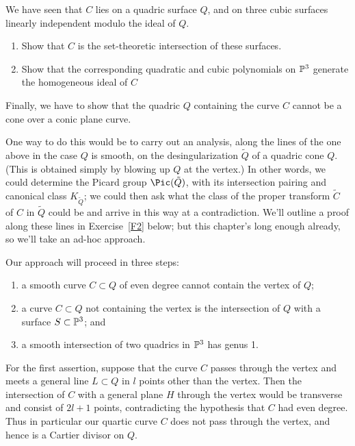 \begin{exercise}
We have seen that $C$ lies on a quadric surface $Q$, and on three cubic surfaces linearly independent modulo the ideal of $Q$.
\begin{enumerate}
\item Show that $C$ is the set-theoretic intersection of these surfaces.
\item Show that the corresponding quadratic and cubic polynomials on $\PP^3$ generate the homogeneous ideal of $C$
\end{enumerate}
\end{exercise}

Finally, we have to show that the quadric $Q$ containing the curve $C$ cannot be a cone over a conic plane curve. 

One way to do this would be to carry out an analysis, along the lines of the one above in the case $Q$ is smooth, on the desingularization $\tilde Q$ of a quadric cone $Q$. (This is obtained simply by  blowing up $Q$ at the vertex.) In other words, we could determine the Picard group $\Pic(\tilde Q)$, with its intersection pairing and canonical class $K_{\tilde Q}$; we could then ask what the class of the proper transform $\tilde C$ of $C$ in $\tilde Q$ could be and arrive in this way at a contradiction. We'll outline a proof along these lines in Exercise~\ref{F2} below; but this chapter's long enough already, so we'll take an ad-hoc approach.

Our approach will proceed in three steps:

\begin{enumerate}
\item a smooth curve $C \subset Q$ of even degree cannot contain the vertex of $Q$;
\item a curve $C \subset Q$ not containing the vertex is the intersection of $Q$ with a surface $S \subset \PP^3$; and
\item a smooth  intersection of two quadrics in $\PP^3$ has genus 1.
\end{enumerate}

For the first assertion, suppose that the curve $C$ passes through the vertex and meets a general line $L \subset Q$ in $l$ points other than the vertex. Then the intersection of $C$ with a general plane $H$ through the vertex would be transverse and consist of $2l+1$ points, contradicting the hypothesis that $C$ had even degree. Thus in particular our quartic curve $C$ does not pass through the vertex, and hence is a Cartier divisor on $Q$.

